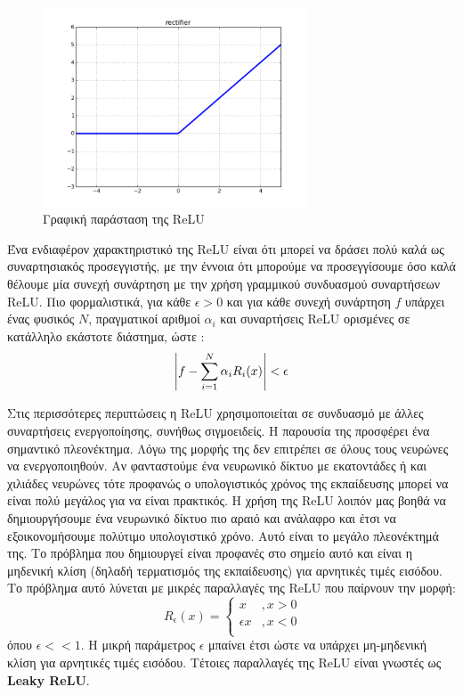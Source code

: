 \documentclass[11pt]{article} %
\numberwithin{equation}{subsection}
\begin{document}
\begin{figure}[H]
    \centering
    \includegraphics[width=0.7\textwidth]{relu}
    \caption{Γραφική παράσταση της ReLU}
    \label{fig:RELU curve}
\end{figure}

Ένα ενδιαφέρον χαρακτηριστικό της ReLU είναι ότι μπορεί να δράσει πολύ καλά ως συναρτησιακός προσεγγιστής, με την έννοια ότι μπορούμε να προσεγγίσουμε όσο καλά θέλουμε μία συνεχή συνάρτηση με την χρήση γραμμικού συνδυασμού συναρτήσεων ReLU. Πιο φορμαλιστικά, για κάθε $\epsilon > 0$ και για κάθε συνεχή συνάρτηση $f$ υπάρχει ένας φυσικός $Ν$, πραγματικοί αριθμοί $\alpha_i$ και συναρτήσεις ReLU ορισμένες σε κατάλληλο εκάστοτε διάστημα, ώστε :
\begin{align*}
\displaystyle \abs{f - \sum_{i=1}^{N} \alpha_i R_i(x)} < \epsilon
\end{align*}

Στις περισσότερες περιπτώσεις η ReLU χρησιμοποιείται σε συνδυασμό με άλλες συναρτήσεις ενεργοποίησης, συνήθως σιγμοειδείς. Η παρουσία της προσφέρει ένα σημαντικό πλεονέκτημα. Λόγω της μορφής της δεν επιτρέπει σε όλους τους νευρώνες να ενεργοποιηθούν. Αν φανταστούμε ένα νευρωνικό δίκτυο με εκατοντάδες ή και χιλιάδες νευρώνες τότε προφανώς ο υπολογιστικός χρόνος της εκπαίδευσης μπορεί να είναι πολύ μεγάλος για να είναι πρακτικός. Η χρήση της ReLU λοιπόν μας βοηθά να δημιουργήσουμε ένα νευρωνικό δίκτυο πιο αραιό και ανάλαφρο και έτσι να εξοικονομήσουμε πολύτιμο υπολογιστικό χρόνο. Αυτό είναι το μεγάλο πλεονέκτημά της. Το πρόβλημα που δημιουργεί είναι προφανές στο σημείο αυτό και είναι η μηδενική κλίση (δηλαδή τερματισμός της εκπαίδευσης) για αρνητικές τιμές εισόδου. Το πρόβλημα αυτό λύνεται με μικρές παραλλαγές της ReLU που παίρνουν την μορφή:
\[ 
\ R_\epsilon(x) = \left\{
\begin{array}{ll}
      x & , x > 0 \\
      \epsilon x & , x < 0 \\
\end{array} 
\right. 
\]
όπου $\epsilon << 1$. Η μικρή παράμετρος $\epsilon$ μπαίνει έτσι ώστε να υπάρχει μη-μηδενική κλίση για αρνητικές τιμές εισόδου. Τέτοιες παραλλαγές της ReLU είναι γνωστές ως \textbf{Leaky ReLU}.\\
\end{document}
